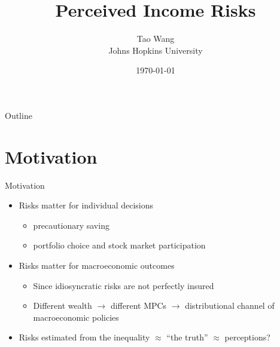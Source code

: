 \documentclass{beamer}
\title{Perceived Income Risks}
\author{Tao Wang \\ Johns Hopkins University}
\date{\today}
\begin{document}
	

\begin{frame}
	\titlepage
\end{frame}
\begin{frame}{Outline}
	\tableofcontents
\end{frame}


\section{Motivation}

\begin{frame}{Motivation}
	\begin{itemize}
		\item Risks matter for individual decisions
		\begin{itemize}
			\item precautionary saving
			\item portfolio choice and stock market participation
		\end{itemize} 
		\item Risks matter for macroeconomic outcomes
		\begin{itemize}
			\item Since idiosyncratic risks are not perfectly insured 
			\item Different wealth $\rightarrow$ different MPCs $\rightarrow$ distributional channel of macroeconomic policies 
		\end{itemize}  %
		\item Risks estimated from the inequality $\approx$  ``the truth''  $\approx$ perceptions? %
	\end{itemize}
\end{frame}
\end{document}
